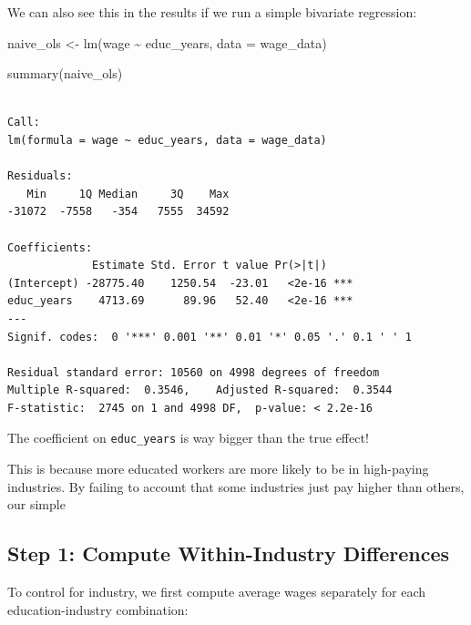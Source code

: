 \documentclass[
  letterpaper,
  DIV=11,
  numbers=noendperiod]{scrreprt}
\newenvironment{Shaded}{\begin{snugshade}}{\end{snugshade}}
\newcommand{\AttributeTok}[1]{\textcolor[rgb]{0.40,0.45,0.13}{#1}}
\newcommand{\FunctionTok}[1]{\textcolor[rgb]{0.28,0.35,0.67}{#1}}
\newcommand{\NormalTok}[1]{\textcolor[rgb]{0.00,0.23,0.31}{#1}}
\newcommand{\OtherTok}[1]{\textcolor[rgb]{0.00,0.23,0.31}{#1}}
\newcommand{\SpecialCharTok}[1]{\textcolor[rgb]{0.37,0.37,0.37}{#1}}
\begin{document}
We can also see this in the results if we run a simple bivariate
regression:

\begin{Shaded}
\begin{Highlighting}[]
\NormalTok{naive\_ols }\OtherTok{\textless{}{-}} \FunctionTok{lm}\NormalTok{(wage }\SpecialCharTok{\textasciitilde{}}\NormalTok{ educ\_years, }\AttributeTok{data =}\NormalTok{ wage\_data)}

\FunctionTok{summary}\NormalTok{(naive\_ols)}
\end{Highlighting}
\end{Shaded}

\begin{verbatim}

Call:
lm(formula = wage ~ educ_years, data = wage_data)

Residuals:
   Min     1Q Median     3Q    Max 
-31072  -7558   -354   7555  34592 

Coefficients:
             Estimate Std. Error t value Pr(>|t|)    
(Intercept) -28775.40    1250.54  -23.01   <2e-16 ***
educ_years    4713.69      89.96   52.40   <2e-16 ***
---
Signif. codes:  0 '***' 0.001 '**' 0.01 '*' 0.05 '.' 0.1 ' ' 1

Residual standard error: 10560 on 4998 degrees of freedom
Multiple R-squared:  0.3546,    Adjusted R-squared:  0.3544 
F-statistic:  2745 on 1 and 4998 DF,  p-value: < 2.2e-16
\end{verbatim}

The coefficient on \texttt{educ\_years} is way bigger than the true
effect!

This is because more educated workers are more likely to be in
high-paying industries. By failing to account that some industries just
pay higher than others, our simple

\subsection{Step 1: Compute Within-Industry
Differences}\label{step-1-compute-within-industry-differences}

To control for industry, we first compute average wages separately for
each education-industry combination:
\end{document}
